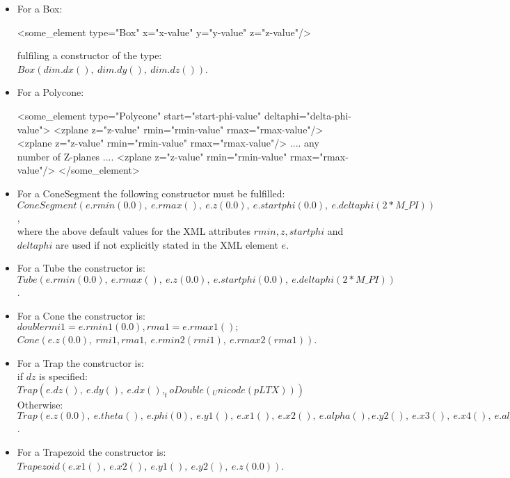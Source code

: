 \documentclass[10pt,a4paper]{article}
\begin{document}
\begin{itemize}
\item For a Box:
\vspace{-0.2cm}
\begin{unnumberedcode}
  <some_element type="Box" x="x-value" y="y-value" z="z-value"/>
\end{unnumberedcode}
fulfiling a constructor of the type: $Box(dim.dx(),~dim.dy(),~dim.dz())$.

\item For a Polycone:
\vspace{-0.2cm}
\begin{unnumberedcode}
  <some_element type="Polycone" start="start-phi-value" deltaphi="delta-phi-value">
    <zplane z="z-value" rmin="rmin-value" rmax="rmax-value"/>
    <zplane z="z-value" rmin="rmin-value" rmax="rmax-value"/>
    .... any number of Z-planes ....
    <zplane z="z-value" rmin="rmin-value" rmax="rmax-value"/>
  </some_element>
\end{unnumberedcode}

\item For a ConeSegment the following constructor must be fulfilled:\\
  $ ConeSegment(e.rmin(0.0),~e.rmax(),~e.z(0.0),~e.startphi(0.0),~e.deltaphi(2*M\_PI))$,\\
where the above default values for the XML attributes $rmin, z, startphi$ and 
$deltaphi$ are used if not explicitly stated in the XML element $e$.

\item For a Tube the constructor is:\\
  $ Tube(e.rmin(0.0),~e.rmax(),~e.z(0.0),~e.startphi(0.0),~e.deltaphi(2*M\_PI))$.

\item For a Cone the constructor is:\\
  $double rmi1 = e.rmin1(0.0), rma1 = e.rmax1();$\\
  $ Cone(e.z(0.0),~rmi1,rma1,~e.rmin2(rmi1),~e.rmax2(rma1))$.

\item For a Trap the constructor is:\\
  if $dz$ is specified: $ Trap(e.dz(),~e.dy(),~e.dx(),_toDouble(_Unicode(pLTX)))$
  Otherwise: \\
  $ Trap(e.z(0.0),~e.theta(),~e.phi(0),~e.y1(),~e.x1(),~e.x2(),~e.alpha(),
                    e.y2(),~e.x3(),~e.x4(),~e.alpha2())$.

\item For a Trapezoid the constructor is:\\
  $ Trapezoid(e.x1(),~e.x2(),~e.y1(),~e.y2(),~e.z(0.0))$.


\end{itemize}
\end{document}

